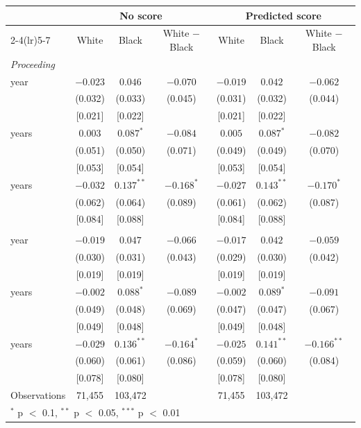 \begin{tabular}{lcccccc}
\toprule
 & \multicolumn{3}{c}{No score} & \multicolumn{3}{c}{Predicted score} \\
\cmidrule(lr){2-4}\cmidrule(lr){5-7}
 & White & Black & White $-$ Black & White & Black & White $-$ Black \\
\midrule
\multicolumn{7}{l}{\textit{Proceeding}} \\
\quad 1 year & $-0.023$ & $0.046$ & $-0.070$ & $-0.019$ & $0.042$ & $-0.062$ \\
 & (0.032) & (0.033) & (0.045) & (0.031) & (0.032) & (0.044) \\
 & [0.021] & [0.022] &  & [0.021] & [0.022] &  \\
\quad 2 years & $0.003$ & $0.087^{*}$ & $-0.084$ & $0.005$ & $0.087^{*}$ & $-0.082$ \\
 & (0.051) & (0.050) & (0.071) & (0.049) & (0.049) & (0.070) \\
 & [0.053] & [0.054] &  & [0.053] & [0.054] &  \\
\quad 3 years & $-0.032$ & $0.137^{**}$ & $-0.168^{*}$ & $-0.027$ & $0.143^{**}$ & $-0.170^{*}$ \\
 & (0.062) & (0.064) & (0.089) & (0.061) & (0.062) & (0.087) \\
 & [0.084] & [0.088] &  & [0.084] & [0.088] &  \\
\addlinespace
\multicolumn{7}{l}{\textit{Revoked}} \\
\quad 1 year & $-0.019$ & $0.047$ & $-0.066$ & $-0.017$ & $0.042$ & $-0.059$ \\
 & (0.030) & (0.031) & (0.043) & (0.029) & (0.030) & (0.042) \\
 & [0.019] & [0.019] &  & [0.019] & [0.019] &  \\
\quad 2 years & $-0.002$ & $0.088^{*}$ & $-0.089$ & $-0.002$ & $0.089^{*}$ & $-0.091$ \\
 & (0.049) & (0.048) & (0.069) & (0.047) & (0.047) & (0.067) \\
 & [0.049] & [0.048] &  & [0.049] & [0.048] &  \\
\quad 3 years & $-0.029$ & $0.136^{**}$ & $-0.164^{*}$ & $-0.025$ & $0.141^{**}$ & $-0.166^{**}$ \\
 & (0.060) & (0.061) & (0.086) & (0.059) & (0.060) & (0.084) \\
 & [0.078] & [0.080] &  & [0.078] & [0.080] &  \\
\midrule
Observations & 71,455 & 103,472 &  & 71,455 & 103,472 &  \\
\bottomrule
\multicolumn{7}{l}{\footnotesize $^{*}$ p $<$ 0.1, $^{**}$ p $<$ 0.05, $^{***}$ p $<$ 0.01} \\
\end{tabular}
